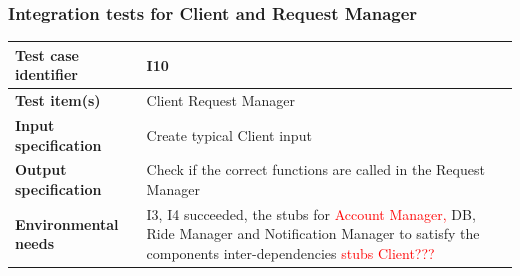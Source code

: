 \documentclass[a4paper,11pt]{report} %
\begin{document}
		\subsubsection{Integration tests for Client and Request Manager} \label{sec:3.1.7}
			\begin{minipage}{\linewidth}
			\end{minipage}		
		\begin{center}
			\renewcommand{\arraystretch}{1.2}
			\setlength{\tabcolsep}{24pt}
			\begin{tabular}{ l  p{9cm}}\hline
				\textbf{Test case identifier} & I10\\\hline
				\textbf{Test item(s)} & Client \textrightarrow Request Manager\\\hline
				\textbf{Input specification} & Create typical Client input \\\hline
				\textbf{Output specification} & Check if the correct functions are called in the Request Manager\\\hline
				\textbf{Environmental needs} &  I3, I4 succeeded, the stubs for \textcolor{red}{Account Manager, }DB, Ride Manager and Notification Manager to satisfy the components inter-dependencies \textcolor{red}{stubs Client???}\\\hline
			\end{tabular}
		\end{center}
		
		\pagebreak		
\end{document}
